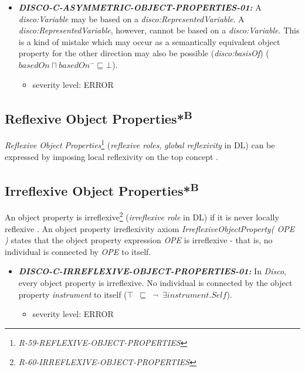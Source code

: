 \documentclass{llncs}
\newcommand{\ms}[1]{\texttt{#1}}
\begin{document}
\begin{itemize}
	\item \textbf{{\em DISCO-C-ASYMMETRIC-OBJECT-PROPERTIES-01:}} 
A {\em disco:Variable} may be based on a {\em disco:RepresentedVariable}.
A {\em disco:RepresentedVariable}, however, cannot be based on a {\em disco:Variable}.
This is a kind of mistake which may occur as a semantically equivalent object property for the other direction may also be possible ({\em disco:basisOf}) (\ms{$basedOn \sqcap basedOn^{-} \sqsubseteq \bot$}).
	\begin{itemize}
		\item severity level: ERROR
	\end{itemize}
\end{itemize}

\subsection{Reflexive Object Properties*\textsuperscript{B}}

\emph{Reflexive Object Properties}\footnote{\emph{R-59-REFLEXIVE-OBJECT-PROPERTIES}} (\emph{reflexive roles}, \emph{global reflexivity} in DL) can be expressed by imposing local reflexivity on the top concept \cite{Kroetzsch2012}.

\subsection{Irreflexive Object Properties*\textsuperscript{B}}

An object property is irreflexive\footnote{\emph{R-60-IRREFLEXIVE-OBJECT-PROPERTIES}} (\emph{irreflexive role} in DL) if it is never locally reflexive \cite{Kroetzsch2012}.
An object property irreflexivity axiom \emph{IrreflexiveObjectProperty( OPE )} states that the object property expression \emph{OPE} is irreflexive - that is, no individual is connected by \emph{OPE} to itself. 

\begin{itemize}
  \item \textbf{{\em DISCO-C-IRREFLEXIVE-OBJECT-PROPERTIES-01:}}
	In \emph{Disco}, every object property is irreflexive.
  No individual is connected by the object property {\em instrument} to itself (\ms{$\top$ $\sqsubseteq$ $\neg$ $\exists  instrument . Self$}).
	\begin{itemize}
		\item severity level: ERROR
	\end{itemize}
\end{itemize}
\end{document}
